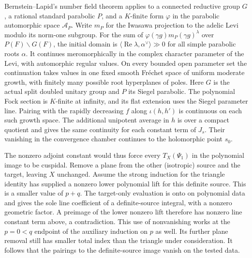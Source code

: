 Bernstein--Lapid's number field theorem applies to a connected
reductive group \(G\), a rational standard parabolic \(P\), and
a \(K\)-finite form \(\varphi\) in the parabolic automorphic space
\(\mathcal A_P\). Write \(m_P\) for the Iwasawa projection to
the adelic Levi modulo its norm-one subgroup. For the sum of
\(\varphi(\gamma g)m_P(\gamma g)^\lambda\) over
\(P(F)\backslash G(F)\), the initial domain is
\(\langle\operatorname{Re}\lambda,\alpha^\vee\rangle\gg0\)
for all simple parabolic roots \(\alpha\). It continues
meromorphically in the complex character parameter of the Levi,
with automorphic regular values. On every bounded open parameter
set the continuation takes values in one fixed smooth Fr\'echet
space of uniform moderate growth, with finitely many possible
root hyperplanes of poles. Here \(G\) is the actual split doubled
unitary group and \(P\) its Siegel parabolic. The polynomial Fock
section is \(K\)-finite at infinity, and its flat extension uses
the Siegel parameter line. Pairing with the rapidly decreasing
\(f\) along \(\iota(h,h')\) is continuous on each such growth space.
The additional unipotent average in \(h\) is over a compact
quotient and gives the same continuity for each constant term
of \(J_s\). Their vanishing in the convergence chamber continues
to the holomorphic point \(s_0\).
\cite[\S\S2.1--2.3, theorem~(1), and \S8.5, Corollary, p.~226]
{p2bernstein-lapid-eisenstein}

The nonzero adjoint constant would thus force every
\(T_X(\Psi_1)\) in the polynomial image to be cuspidal. Remove
a plane from the other (isotropic) source and the target, leaving
\(X\) unchanged. Assume the strong induction for the triangle
identity has supplied a nonzero lower polynomial lift for this
definite source. This is a smaller value of \(p+q\). The target-only
evaluation is onto on polynomial data and gives the sole line
coefficient of a definite-source integral, with a nonzero geometric
factor. A preimage of the lower nonzero lift therefore has nonzero
line constant term above, a contradiction. This use of nonvanishing
works at the \(p=0<q\) endpoint of the auxiliary induction on \(p\)
as well. Its further plane removal still has smaller total index
than the triangle under consideration. It follows that the
pairings to the definite-source image vanish on the tested data.

